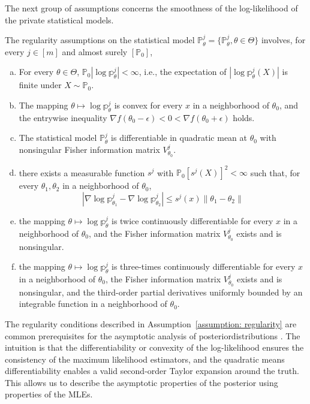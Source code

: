 \documentclass[twoside,11pt]{article}
\numberwithin{equation}{section}
\newcommand\bP{\mathbb{P}}
\newcommand\bp{\mathbb{p}}
\begin{document}
{The next group of assumptions concerns the smoothness of the log-likelihood of the private statistical models. 
\begin{assumption}\label{assumption: regularity}
The regularity assumptions on the statistical model $\bP_\theta^j = \{\bP_\theta^j,  \theta \in \Theta\}$ involves, for every $j \in [m]$ and almost surely $[\bP_0]$, 
\begin{enumerate}[(a)]
    \item For every $\theta \in \Theta$,  $\bP_0 |\log \bp_\theta^j| < \infty$, {i.e., the expectation of $|\log \bp_\theta^j(X)|$ is finite under $X \sim \bP_0$}. 
    \item The mapping $\theta \mapsto \log \bp_\theta^j$ is convex for every $x$ in a neighborhood of $\theta_0$, and the entrywise inequality $\nabla f(\theta_0 - \epsilon) < 0 < \nabla f(\theta_0 + \epsilon)$ holds.  
    \item The statistical model $\bP_\theta^j$ is differentiable in quadratic mean at $\theta_0$ with nonsingular Fisher information matrix $V_{\theta_0}^j$.  
    \item  there exists a measurable function $s^j$ with $\bP_0 [s^j(X)]^2 < \infty$ such that, for every $\theta_1, \theta_2$ in a neighborhood of $\theta_0$, 
        \begin{equation*}
            |\nabla \log \bp_{\theta_1}^j - \nabla \log \bp_{\theta_2}^j| \leq s^j(x) \|\theta_1 - \theta_2 \|
        \end{equation*}
    \item the mapping $\theta \mapsto \log \bp_\theta^j$ is twice continuously differentiable for every $x$ in a neighborhood of $\theta_0$, and the Fisher information matrix $V_{\theta_0}^j$ exists and is nonsingular. 
    \item the mapping $\theta \mapsto \log \bp_\theta^j$ is three-times continuously differentiable for every $x$ in a neighborhood of $\theta_0$, the Fisher information matrix $V_{\theta_0}^j$ exists and is nonsingular, and the third-order partial derivatives uniformly bounded by an integrable function in a neighborhood of $\theta_0$. 
\end{enumerate}
\end{assumption}
{The regularity conditions described in Assumption~\ref{assumption: regularity} are common prerequisites for the asymptotic analysis of posteriordistributions \citep{VanderVaart2000}. The intuition is that the differentiability or convexity of the log-likelihood ensures the consistency of the maximum likelihood estimators, and the quadratic means differentiability enables a valid second-order Taylor expansion around the truth. This allows us to describe the asymptotic properties of the posterior using properties of the MLEs.}

}
\end{document}

